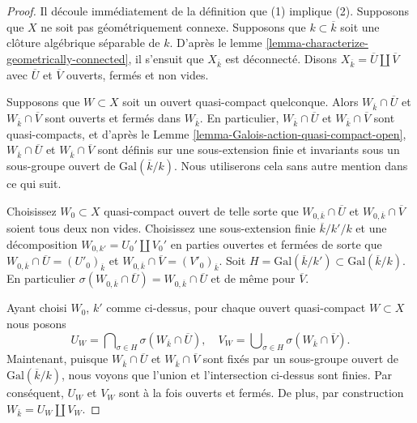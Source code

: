 \begin{proof}
Il découle immédiatement de la définition que (1)
implique (2). Supposons que $X$ ne soit pas
géométriquement connexe. Supposons que $k \subset
\overline{k}$ soit une clôture algébrique séparable de $k$.
D'après le lemme
\ref{lemma-characterize-geometrically-connected}, il s'ensuit que
$X_{\overline{k}}$ est déconnecté. Disons $X_{\overline{k}} = \overline{U} \amalg
\overline{V}$ avec $\overline{U}$ et $\overline{V}$ ouverts, fermés et non vides.

\medskip\noindent
Supposons que $W \subset X$ soit un ouvert quasi-compact
quelconque. Alors $W_{\overline{k}} \cap \overline{U}$ et
$W_{\overline{k}} \cap \overline{V}$ sont ouverts et
fermés dans $W_{\overline{k}}$. En particulier,
$W_{\overline{k}} \cap \overline{U}$ et $W_{\overline{k}}
\cap \overline{V}$ sont quasi-compacts, et d'après le Lemme
\ref{lemma-Galois-action-quasi-compact-open},
$W_{\overline{k}} \cap \overline{U}$ et $W_{\overline{k}} \cap
\overline{V}$ sont définis sur une sous-extension finie et
invariants sous un sous-groupe ouvert de
$\text{Gal}(\overline{k}/k)$. Nous utiliserons cela sans autre mention dans ce qui suit.

\medskip\noindent
Choisissez $W_0 \subset X$ quasi-compact ouvert de
telle sorte que $W_{0, \overline{k}} \cap
\overline{U}$ et $W_{0, \overline{k}} \cap
\overline{V}$ soient tous deux non vides. Choisissez
une sous-extension finie $\overline{k}/k'/k$ et une
décomposition $W_{0, k'} = U_0' \amalg V_0'$ en
parties ouvertes et fermées de sorte que $W_{0,
\overline{k}} \cap \overline{U} =
(U'_0)_{\overline{k}}$ et $W_{0, \overline{k}} \cap
\overline{V} = (V'_0)_{\overline{k}}$. Soit $H =
\text{Gal}(\overline{k}/k') \subset \text{Gal}(\overline{k}/k)$.
En particulier $\sigma(W_{0, \overline{k}} \cap \overline{U}) =
W_{0, \overline{k}} \cap \overline{U}$ et de même pour $\overline{V}$.

\medskip\noindent
Ayant choisi $W_0$, $k'$ comme ci-dessus, pour
chaque ouvert quasi-compact $W \subset X$ nous posons
$$
U_W =
\bigcap\nolimits_{\sigma \in H} \sigma(W_{\overline{k}} \cap \overline{U}),
\quad
V_W =
\bigcup\nolimits_{\sigma \in H} \sigma(W_{\overline{k}} \cap \overline{V}).
$$
Maintenant, puisque $W_{\overline{k}} \cap \overline{U}$ et
$W_{\overline{k}} \cap \overline{V}$ sont fixés par un sous-groupe ouvert
de $\text{Gal}(\overline{k}/k)$, nous voyons que l'union et
l'intersection ci-dessus sont finies. Par conséquent, $U_W$ et $V_W$ sont à la
fois ouverts et fermés. De plus, par construction $W_{\bar k} = U_W \amalg V_W$.


\end{proof}
